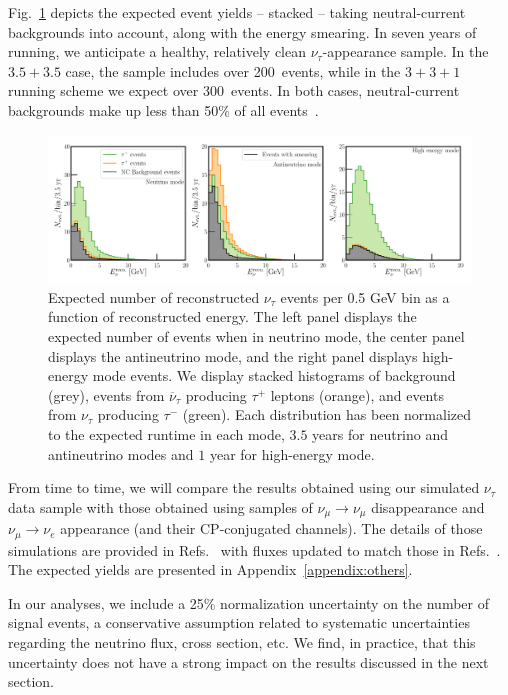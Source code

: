\documentclass[aps,prd,onecolumn,nofootinbib,superscriptaddress, 11pt]{revtex4}
\begin{document}
Fig.~\ref{fig:EventYields_Stack} depicts the expected event yields -- stacked -- taking neutral-current backgrounds into account, along with the energy smearing. In seven years of running, we anticipate a healthy, relatively clean $\nu_{\tau}$-appearance sample. In the $3.5+3.5$ case, the sample includes over 200~events, while in the $3+3+1$ running scheme we expect over 300~events. In both cases, neutral-current backgrounds make up less than 50\% of all events~\cite{AdamSlides}.
\begin{figure}[ht]
\centerline{
\includegraphics[width=1\textwidth]{EventYields_Stack.pdf}}
\caption{Expected number of reconstructed $\nu_\tau$ events per 0.5 GeV bin as a function of reconstructed energy. The left panel displays the expected number of events when in neutrino mode, the center panel displays the antineutrino mode, and the right panel displays high-energy mode events. We display stacked histograms of background (grey), events from $\overline{\nu}_\tau$ producing $\tau^+$ leptons (orange), and events from $\nu_\tau$ producing $\tau^-$ (green). Each distribution has been normalized to the expected runtime in each mode, $3.5$ years for neutrino and antineutrino modes and $1$ year for high-energy mode.}\label{fig:EventYields_Stack}
\end{figure}

From time to time, we will compare the results obtained using our simulated $\nu_\tau$ data sample with those obtained using samples of $\nu_\mu \to \nu_\mu$ disappearance and $\nu_\mu \to \nu_e$ appearance (and their CP-conjugated channels). The details of those simulations are provided in Refs.~\cite{Berryman:2015nua,deGouvea:2015ndi,Berryman:2016szd,deGouvea:2016pom,deGouvea:2017yvn} with fluxes updated to match those in Refs.~\cite{LauraFlux,Acciarri:2015uup}. The expected yields are presented in Appendix~\ref{appendix:others}.

In our analyses, we include a 25\% normalization uncertainty on the number of signal events, a conservative assumption related to systematic uncertainties regarding the neutrino flux, cross section, etc. We find, in practice, that this uncertainty does not have a strong impact on the results discussed in the next section. 
\end{document}
